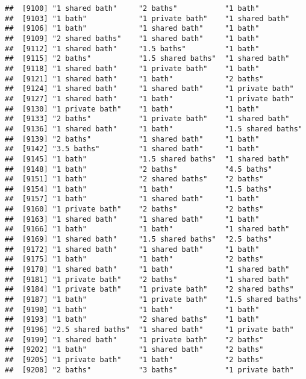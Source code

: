 \documentclass[
]{article}
\begin{document}
\begin{verbatim}
##  [9100] "1 shared bath"     "2 baths"           "1 bath"           
##  [9103] "1 bath"            "1 private bath"    "1 shared bath"    
##  [9106] "1 bath"            "1 shared bath"     "1 bath"           
##  [9109] "2 shared baths"    "1 shared bath"     "1 bath"           
##  [9112] "1 shared bath"     "1.5 baths"         "1 bath"           
##  [9115] "2 baths"           "1.5 shared baths"  "1 shared bath"    
##  [9118] "1 shared bath"     "1 private bath"    "1 bath"           
##  [9121] "1 shared bath"     "1 bath"            "2 baths"          
##  [9124] "1 shared bath"     "1 shared bath"     "1 private bath"   
##  [9127] "1 shared bath"     "1 bath"            "1 private bath"   
##  [9130] "1 private bath"    "1 bath"            "1 bath"           
##  [9133] "2 baths"           "1 private bath"    "1 shared bath"    
##  [9136] "1 shared bath"     "1 bath"            "1.5 shared baths" 
##  [9139] "2 baths"           "1 shared bath"     "1 bath"           
##  [9142] "3.5 baths"         "1 shared bath"     "1 bath"           
##  [9145] "1 bath"            "1.5 shared baths"  "1 shared bath"    
##  [9148] "1 bath"            "2 baths"           "4.5 baths"        
##  [9151] "1 bath"            "2 shared baths"    "2 baths"          
##  [9154] "1 bath"            "1 bath"            "1.5 baths"        
##  [9157] "1 bath"            "1 shared bath"     "1 bath"           
##  [9160] "1 private bath"    "2 baths"           "2 baths"          
##  [9163] "1 shared bath"     "1 shared bath"     "1 bath"           
##  [9166] "1 bath"            "1 bath"            "1 shared bath"    
##  [9169] "1 shared bath"     "1.5 shared baths"  "2.5 baths"        
##  [9172] "1 shared bath"     "1 shared bath"     "1 bath"           
##  [9175] "1 bath"            "1 bath"            "2 baths"          
##  [9178] "1 shared bath"     "1 bath"            "1 shared bath"    
##  [9181] "1 private bath"    "2 baths"           "1 shared bath"    
##  [9184] "1 private bath"    "1 private bath"    "2 shared baths"   
##  [9187] "1 bath"            "1 private bath"    "1.5 shared baths" 
##  [9190] "1 bath"            "1 bath"            "1 bath"           
##  [9193] "1 bath"            "2 shared baths"    "1 bath"           
##  [9196] "2.5 shared baths"  "1 shared bath"     "1 private bath"   
##  [9199] "1 shared bath"     "1 private bath"    "2 baths"          
##  [9202] "1 bath"            "1 shared bath"     "2 baths"          
##  [9205] "1 private bath"    "1 bath"            "2 baths"          
##  [9208] "2 baths"           "3 baths"           "1 private bath"   

\end{verbatim}
\end{document}
